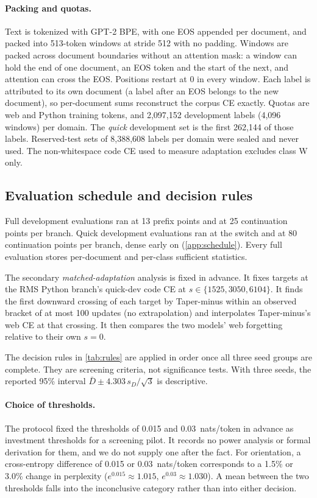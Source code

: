 \documentclass[11pt]{article}
\begin{document}
\paragraph{Packing and quotas.} Text is tokenized with GPT-2 BPE, with one EOS appended per document, and packed
into 513-token windows at stride 512 with no padding. Windows are packed across document boundaries without an
attention mask: a window can hold the end of one document, an EOS token and the start of the next, and attention
can cross the EOS. Positions restart at 0 in every window. Each label is attributed to its own document (a label
after an EOS belongs to the new document), so per-document sums reconstruct the corpus CE exactly. Quotas are
\webTrainTokens{} web and \pyTrainTokens{} Python training tokens, and 2{,}097{,}152 development labels (4{,}096
windows) per domain. The \emph{quick} development set is the first 262{,}144 of those labels. Reserved-test sets
of 8{,}388{,}608 labels per domain were sealed and never used. The non-whitespace code CE used to measure
adaptation excludes class W only.

\subsection{Evaluation schedule and decision rules}

Full development evaluations ran at 13 prefix points and at 25 continuation points per branch. Quick development
evaluations ran at the switch and at 80 continuation points per branch, dense early on (\cref{app:schedule}).
Every full evaluation stores per-document and per-class sufficient statistics.

The secondary \emph{matched-adaptation} analysis is fixed in advance. It fixes targets at the RMS Python branch's
quick-dev code CE at $s \in \{1525, 3050, 6104\}$. It finds the first downward crossing of each target by
Taper-minus within an observed bracket of at most 100 updates (no extrapolation) and interpolates Taper-minus's
web CE at that crossing. It then compares the two models' web forgetting relative to their own $s = 0$.

The decision rules in \cref{tab:rules} are applied in order once all three seed groups are complete. They are
screening criteria, not significance tests. With three seeds, the reported 95\% interval
$\bar D \pm 4.303\, s_D/\sqrt{3}$ is descriptive.

\paragraph{Choice of thresholds.} The protocol fixed the thresholds of 0.015 and 0.03~nats/token in advance as
investment thresholds for a screening pilot. It records no power analysis or formal derivation for them, and we
do not supply one after the fact. For orientation, a cross-entropy difference of 0.015 or 0.03~nats/token
corresponds to a 1.5\% or 3.0\% change in perplexity ($e^{0.015} \approx 1.015$, $e^{0.03} \approx 1.030$).
A mean between the two thresholds falls into the inconclusive category rather than into either decision.
\end{document}
